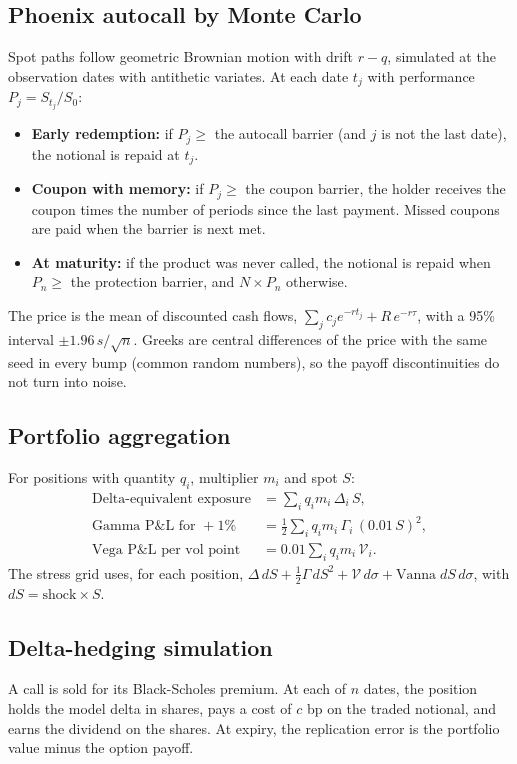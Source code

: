 \documentclass[11pt,a4paper]{article}
\begin{document}
\subsection{Phoenix autocall by Monte Carlo}
Spot paths follow geometric Brownian motion with drift $r-q$, simulated at the observation dates with antithetic variates. At each date $t_j$ with performance $P_j=S_{t_j}/S_0$:
\begin{itemize}
\item \textbf{Early redemption:} if $P_j\ge$ the autocall barrier (and $j$ is not the last date), the notional is repaid at $t_j$.
\item \textbf{Coupon with memory:} if $P_j\ge$ the coupon barrier, the holder receives the coupon times the number of periods since the last payment. Missed coupons are paid when the barrier is next met.
\item \textbf{At maturity:} if the product was never called, the notional is repaid when $P_n\ge$ the protection barrier, and $N\times P_n$ otherwise.
\end{itemize}
The price is the mean of discounted cash flows, $\sum_j c_j e^{-rt_j}+R\,e^{-r\tau}$, with a 95\% interval $\pm1.96\,s/\sqrt{n}$. Greeks are central differences of the price with the same seed in every bump (common random numbers), so the payoff discontinuities do not turn into noise.

\subsection{Portfolio aggregation}
For positions with quantity $q_i$, multiplier $m_i$ and spot $S$:
\begin{align*}
\text{Delta-equivalent exposure}&=\sum_i q_im_i\,\Delta_i\,S,\\
\text{Gamma P\&L for }+1\%&=\tfrac12\sum_i q_im_i\,\Gamma_i\,(0.01\,S)^2,\\
\text{Vega P\&L per vol point}&=0.01\sum_i q_im_i\,\mathcal{V}_i .
\end{align*}
The stress grid uses, for each position, $\Delta\,dS+\tfrac12\Gamma\,dS^2+\mathcal{V}\,d\sigma+\text{Vanna}\;dS\,d\sigma$, with $dS=\text{shock}\times S$.

\subsection{Delta-hedging simulation}
A call is sold for its Black-Scholes premium. At each of $n$ dates, the position holds the model delta in shares, pays a cost of $c$ bp on the traded notional, and earns the dividend on the shares. At expiry, the replication error is the portfolio value minus the option payoff.
\end{document}
